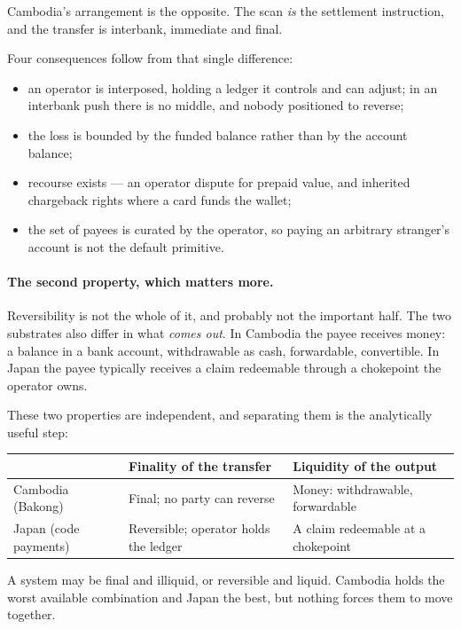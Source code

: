 \documentclass[10pt,a4paper,twocolumn]{article}
\makeatletter
\newcommand{\threecol}{@{}p{0.19\columnwidth}p{0.36\columnwidth}p{0.37\columnwidth}@{}}
\newcommand{\threecol}{@{}lll@{}}
\makeatother
\begin{document}
Cambodia's arrangement is the opposite. The scan \emph{is} the settlement
instruction, and the transfer is interbank, immediate and final.

Four consequences follow from that single difference:

\begin{itemize}[leftmargin=1.4em]
  \item an operator is interposed, holding a ledger it controls and can adjust;
    in an interbank push there is no middle, and nobody positioned to reverse;
  \item the loss is bounded by the funded balance rather than by the account
    balance;
  \item recourse exists --- an operator dispute for prepaid value, and inherited
    chargeback rights where a card funds the wallet;
  \item the set of payees is curated by the operator, so paying an arbitrary
    stranger's account is not the default primitive.
\end{itemize}

\paragraph{The second property, which matters more.}
Reversibility is not the whole of it, and probably not the important half. The
two substrates also differ in what \emph{comes out}. In Cambodia the payee
receives money: a balance in a bank account, withdrawable as cash, forwardable,
convertible. In Japan the payee typically receives a claim redeemable through a
chokepoint the operator owns.

These two properties are independent, and separating them is the analytically
useful step:

\begin{center}
\small
\begin{tabular}{\threecol}
\toprule
 & \textbf{Finality of the transfer} & \textbf{Liquidity of the output} \\
\midrule
Cambodia (Bakong) & Final; no party can reverse & Money: withdrawable, forwardable \\
Japan (code payments) & Reversible; operator holds the ledger & A claim redeemable at a chokepoint \\
\bottomrule
\end{tabular}
\end{center}

\noindent A system may be final and illiquid, or reversible and liquid. Cambodia
holds the worst available combination and Japan the best, but nothing forces
them to move together.
\end{document}
